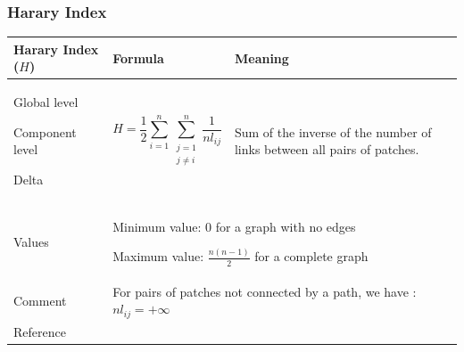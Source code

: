 \documentclass{article}
\begin{document}
\subsubsection{Harary Index}
\label{metric_H}
\begin{table}[H]
\begin{tabular}{|m{3.24cm}|m{4.4810004cm}m{7.924cm}|}
\hline
Harary Index ($H$) &
\multicolumn{1}{m{4.4810004cm}|}{Formula} &
Meaning\\\hline
Global level

Component level

Delta  &
\multicolumn{1}{m{4.4810004cm}|}{\begin{equation*}
H=\frac{1}{2}\sum _{i=1}^{n}{\sum
_{\begin{matrix}j=1\\j{\neq}i\end{matrix}}^{n}{\frac{1}{{\mathit{nl}}_{\mathit{ij}}}}}
\end{equation*}
} &
Sum of the inverse of the number of links between all pairs of patches.

\\\hline
Values &
\multicolumn{2}{m{12.6050005cm}|}{Minimum value: 0 for a graph with no edges

Maximum value: $\frac{n(n-1)}{2}$ for a complete graph

}\\\hline
Comment &
\multicolumn{2}{m{12.6050005cm}|}{For pairs of patches not connected by
a path, we have :   ${\mathit{nl}}_{\mathit{ij}}=+{\infty}$}\\\hline
Reference &
\multicolumn{2}{m{12.6050005cm}|}{\cite{Ricotta2000}}\\\hline
\end{tabular}
\end{table}
\end{document}
